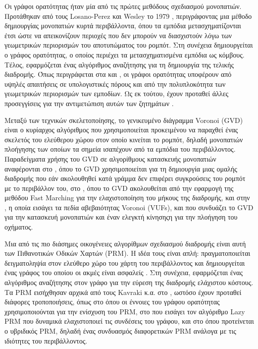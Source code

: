 Οι γράφοι ορατότητας ήταν μία από τις πρώτες μεθόδους σχεδιασμού μονοπατιών.
Προτάθηκαν από τους Losano-Perez και Wesley το 1979 \cite{Lozano-Perez1979},
περιγράφοντας μια μέθοδο δημιουργίας μονοπατιών κυρτά περιβάλλοντα, όπου τα
εμπόδια μετασχηματίζονται έτσι ώστε να απεικονίζουν περιοχές που δεν μπορούν να
διασχιστούν λόγω των γεωμετρικών περιορισμών του αποτυπώματος του ρομπότ.  Στη
συνέχεια δημιουργείται ο γράφος ορατότητας, ο οποίος περιέχει τα
μετασχηματισμένα εμπόδια ως κόμβους. Τέλος, εφαρμόζεται ένας αλγόριθμος
αναζήτησης για τη δημιουργία της τελικής διαδρομής. Όπως περιγράφεται στα
\cite{Ghosh2007} και \cite{Ghosh2013}, οι γράφοι ορατότητας υποφέρουν από
υψηλές απαιτήσεις σε υπολογιστικές πόρους και από την πολυπλοκότητα των
γεωμετρικών περιορισμών των εμποδίων. Ως εκ τούτου, έχουν προταθεί άλλες
προσεγγίσεις για την αντιμετώπιση αυτών των ζητημάτων \cite{Kim2011}.

Μεταξύ των τεχνικών σκελετοποίησης, το γενικευμένο διάγραμμα Voronoi (GVD)
είναι ο κυρίαρχος αλγόριθμος που χρησιμοποιείται προκειμένου να παραχθεί ένας
σκελετός του ελεύθερου χώρου στον οποίο κινείται το ρομπότ, δηλαδή μονοπατιών
πλοήγησης των οποίων τα σημεία ισαπέχουν από τα εμπόδια του περιβάλλοντος.
Παραδείγματα χρήσης του GVD σε αλγορίθμους κατασκευής μονοπατιών αναφέρονται
στο \cite{Bhattacharya2007}, όπου το GVD χρησιμοποιείται για τη δημιουργία μιας
ομαλής διαδρομής που εάν ακολουθηθεί κατά γράμμα δεν επιφέρει συγκρούσεις του
ρομπότ με το περιβάλλον του, στο \cite{Garrido2006}, όπου το GVD ακολουθείται
από την εφαρμογή της μεθόδου Fast Marching για την ελαχιστοποίηση του μήκους
της διαδρομής, και στην \cite{Ok2013}, η οποία εισάγει τα πεδία αβεβαιότητας
Voronoi (VUFs), και που συνδυάζει το GVD για την κατασκευή μονοπατιών και έναν
ελεγκτή κίνησηςη για την πλοήγηση του οχήματος.

Μια από τις πιο διάσημες οικογένειες αλγορίθμων σχεδιασμού διαδρομής είναι αυτή
των Πιθανοτικών Οδικών Χαρτών (PRM). Η ιδέα τους είναι απλή: πραγματοποιείται
δειγματοληψία στον ελεύθερο χώρο του χάρτη του περιβάλλοντος και δημιουργείται
ένας γράφος του οποίου οι ακμές είναι ασφαλείς . Στη συνέχεια, εφαρμόζεται ένας
αλγόριθμος αναζήτησης στον γράφο για την εύρεση της διαδρομής ελάχιστου
κόστους. Τα PRM εισήχθησαν αρχικά από τους Kavraki κ.α.  στο
\cite{Kavraki1996}, ωστόσο έχουν προταθεί διάφορες τροποποιήσεις, όπως στο
\cite{Nissoux} όπου οι έννοιες του γράφου ορατότητας χρησιμοποιούνται για την
ενίσχυση του PRM, στο \cite{Bohlin2000} που εισάγει τον αλγόριθμο Lazy PRM που
δυναμικά ελαχιστοποιεί τις συνδέσεις του γράφου, και στο \cite{Hsua} όπου
προτείνεται ο υβριδικός PRM, δηλαδή ένας συνδυασμός διαφορετικών PRM ανάλογα με
τις ιδιότητες του περιβάλλοντος.

